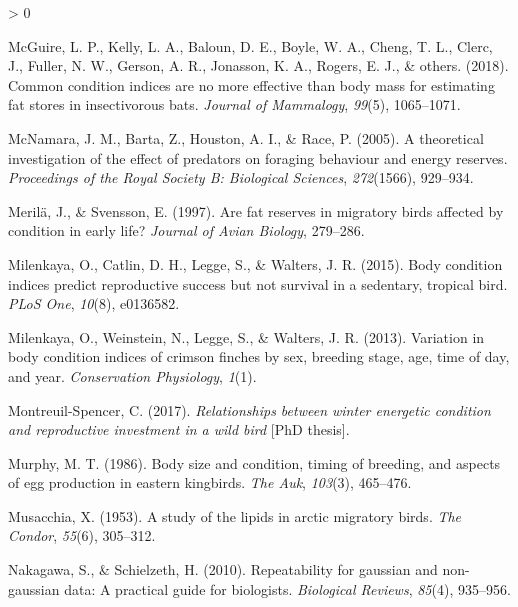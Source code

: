 \documentclass[
]{article}
\newlength{\cslhangindent}
\newenvironment{CSLReferences}[2] %
 {%
  \setlength{\parindent}{0pt}
  \ifodd #1 \everypar{\setlength{\hangindent}{\cslhangindent}}\ignorespaces\fi
  \ifnum #2 > 0
  \setlength{\parskip}{#2\baselineskip}
  \fi
 }%
 {}
\begin{document}
\begin{CSLReferences}{1}{0}
\leavevmode\hypertarget{ref-mcguire2018common}{}%
McGuire, L. P., Kelly, L. A., Baloun, D. E., Boyle, W. A., Cheng, T. L.,
Clerc, J., Fuller, N. W., Gerson, A. R., Jonasson, K. A., Rogers, E. J.,
\& others. (2018). Common condition indices are no more effective than
body mass for estimating fat stores in insectivorous bats. \emph{Journal
of Mammalogy}, \emph{99}(5), 1065--1071.

\leavevmode\hypertarget{ref-mcnamara2005theoretical}{}%
McNamara, J. M., Barta, Z., Houston, A. I., \& Race, P. (2005). A
theoretical investigation of the effect of predators on foraging
behaviour and energy reserves. \emph{Proceedings of the Royal Society B:
Biological Sciences}, \emph{272}(1566), 929--934.

\leavevmode\hypertarget{ref-merila1997fat}{}%
Merilä, J., \& Svensson, E. (1997). Are fat reserves in migratory birds
affected by condition in early life? \emph{Journal of Avian Biology},
279--286.

\leavevmode\hypertarget{ref-milenkaya2015body}{}%
Milenkaya, O., Catlin, D. H., Legge, S., \& Walters, J. R. (2015). Body
condition indices predict reproductive success but not survival in a
sedentary, tropical bird. \emph{PLoS One}, \emph{10}(8), e0136582.

\leavevmode\hypertarget{ref-milenkaya2013variation}{}%
Milenkaya, O., Weinstein, N., Legge, S., \& Walters, J. R. (2013).
Variation in body condition indices of crimson finches by sex, breeding
stage, age, time of day, and year. \emph{Conservation Physiology},
\emph{1}(1).

\leavevmode\hypertarget{ref-montreuil2017relationships}{}%
Montreuil-Spencer, C. (2017). \emph{Relationships between winter
energetic condition and reproductive investment in a wild bird} {[}PhD
thesis{]}.

\leavevmode\hypertarget{ref-murphy1986body}{}%
Murphy, M. T. (1986). Body size and condition, timing of breeding, and
aspects of egg production in eastern kingbirds. \emph{The Auk},
\emph{103}(3), 465--476.

\leavevmode\hypertarget{ref-musacchia1953study}{}%
Musacchia, X. (1953). A study of the lipids in arctic migratory birds.
\emph{The Condor}, \emph{55}(6), 305--312.

\leavevmode\hypertarget{ref-nakagawa2010repeatability}{}%
Nakagawa, S., \& Schielzeth, H. (2010). Repeatability for gaussian and
non-gaussian data: A practical guide for biologists. \emph{Biological
Reviews}, \emph{85}(4), 935--956.


\end{CSLReferences}
\end{document}
